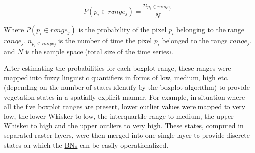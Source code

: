 \documentclass[12pt,oneside]{article}
\begin{document}
\begin{equation} 
P(p_i \in range_j) = \frac{n_{p_i \in range_j}}{N}
\label{eq:eq1}
\end{equation}

Where \(P(p_i \in range_j)\) is the probability of the pixel \(p_i\) belonging to the range \(range_j\), \(n_{p_i \in range_j}\) is the number of time the pixel \(p_i\) belonged to the range \(range_j\), and \(N\) is the sample space (total size of the time series).

After estimating the probabilities for each boxplot range, these ranges were mapped into fuzzy linguistic quantifiers in forms of low, medium, high etc. (depending on the number of states identify by the boxplot algorithm) to provide vegetation states in a spatially explicit manner. For example, in situation where all the five boxplot ranges are present, lower outlier values were mapped to very low, the lower Whisker to low, the interquartile range to medium, the upper Whisker to high and the upper outliers to very high. These states, computed in separated raster layers, were then merged into one single layer to provide discrete states on which the \href{https://en.wikipedia.org/wiki/Bayesian_network}{BNs} can be easily operationalized.
\end{document}
